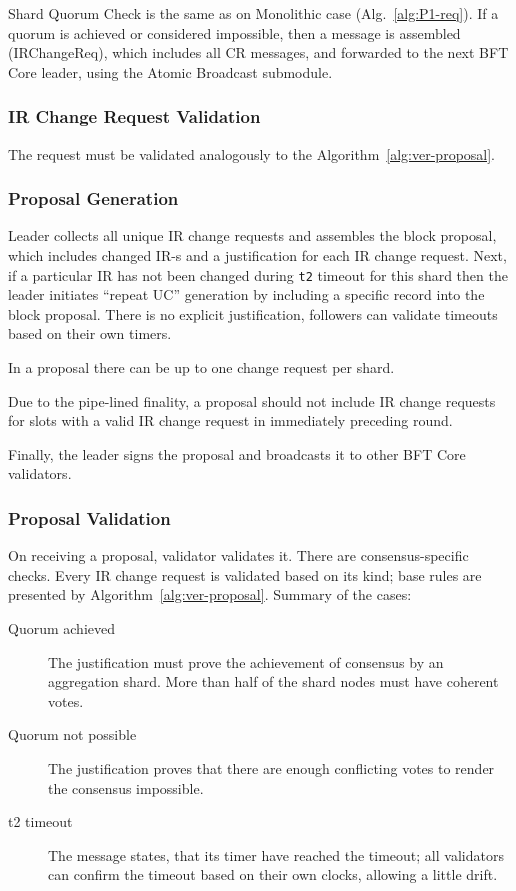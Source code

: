 Shard Quorum Check is the same as on Monolithic case (Alg.~\ref{alg:P1-req}). If a quorum is achieved or considered impossible, then a message is assembled (IRChangeReq), which includes all CR messages, and forwarded to the next BFT Core leader, using the Atomic Broadcast submodule.

\subsubsection{IR Change Request Validation}

The request must be validated analogously to the Algorithm~\ref{alg:ver-proposal}.

\subsubsection{Proposal Generation}

Leader collects all unique IR change requests and assembles the block proposal, which includes changed IR-s and a justification for each IR change request.
Next, if a particular IR has not been changed during \texttt{t2} timeout for this shard then the leader initiates ``repeat UC'' generation by including a specific record into the block proposal. There is no explicit justification, followers can validate timeouts based on their own timers.

In a proposal there can be up to one change request per shard.

Due to the pipe-lined finality, a proposal should not include IR change requests for slots with a valid IR change request in immediately preceding round. %

Finally, the leader signs the proposal and broadcasts it to other BFT Core validators.

\subsubsection{Proposal Validation}

On receiving a proposal, validator validates it. There are consensus-specific checks. Every IR change request is validated based on its kind; base rules are presented by Algorithm~\ref{alg:ver-proposal}. Summary of the cases:

\begin{description}
  \item [Quorum achieved] The justification must prove the achievement of consensus by an aggregation shard. More than half of the shard nodes must have coherent votes.
  \item [Quorum not possible] The justification proves that there are enough conflicting votes to render the consensus impossible.
  \item [t2 timeout] The message states, that its timer have reached the timeout; all validators can confirm the timeout based on their own clocks, allowing a little drift.
\end{description}

